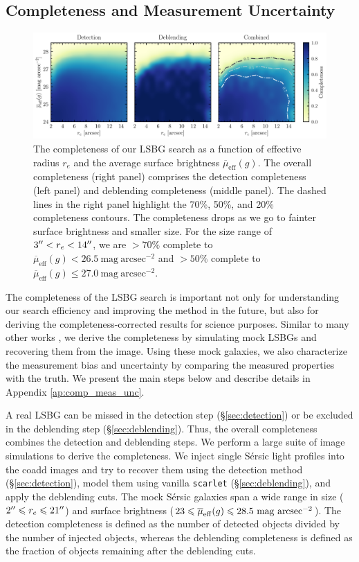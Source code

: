 \documentclass[twocolumn,astrosymb,twocolappendix,linenumbers]{aastex631}
\newcommand{\sbunit}{\mathrm{mag\ arcsec}^{-2}}
\newcommand{\sbeff}{\overline{\mu}_{\mathrm{eff}}(g)}
\newcommand{\code}[1]{\texttt{#1}}
\newcommand{\sersic}{S\'ersic}
\begin{document}
\begin{CJK*}{UTF8}{gbsn}
\subsection{Completeness and Measurement Uncertainty}\label{sec:comp_meas}
\begin{figure}
	\vbox{ 
		\centering
		\includegraphics[width=1\linewidth]{completeness.pdf}
	}
	\caption{The completeness of our LSBG search as a function of effective radius $r_e$ and the average surface brightness $\sbeff$. The overall completeness (right panel) comprises the detection completeness (left panel) and deblending completeness (middle panel). The dashed lines in the right panel highlight the 70\%, 50\%, and 20\% completeness contours. The completeness drops as we go to fainter surface brightness and smaller size. For the size range of $3\mbox{$^{\prime\prime}$} < r_e < 14\mbox{$^{\prime\prime}$}$, we are $>70\%$ complete to $\sbeff < 26.5\ \sbunit$ and $>50\%$ complete to $\sbeff \leqslant 27.0\ \sbunit$. 
	}
	\label{fig:completeness}
\end{figure}

The completeness of the LSBG search is important not only for understanding our search efficiency and improving the method in the future, but also for deriving the completeness-corrected results for science purposes. Similar to many other works \citep[e.g.,][]{vdBurg2017,Zaritsky2021,CarlstenELVES2022,Greene2022}, we derive the completeness by simulating mock LSBGs and recovering them from the image. Using these mock galaxies, we also characterize the measurement bias and uncertainty by comparing the measured properties with the truth. We present the main steps below and describe details in Appendix \ref{ap:comp_meas_unc}.

A real LSBG can be missed in the detection step (\S \ref{sec:detection}) or be excluded in the deblending step (\S \ref{sec:deblending}). Thus, the overall completeness combines the detection and deblending steps. We perform a large suite of image simulations to derive the completeness. We inject single \sersic{} light profiles \citep{Sersic1963} into the coadd images and try to recover them using the detection method (\S\ref{sec:detection}), model them using vanilla \code{scarlet} (\S\ref{sec:deblending}), and apply the deblending cuts. The mock \sersic{} galaxies span a wide range in size ($2\mbox{$^{\prime\prime}$} \leqslant r_{e} \leqslant 21\mbox{$^{\prime\prime}$}$) and surface brightness ($23 \leqslant \overline{\mu}_{\rm eff}(g) \leqslant 28.5\ \mathrm{mag\ arcsec^{-2}}$). The detection completeness is defined as the number of detected objects divided by the number of injected objects, whereas the deblending completeness is defined as the fraction of objects remaining after the deblending cuts. 


\end{CJK*}
\end{document}

